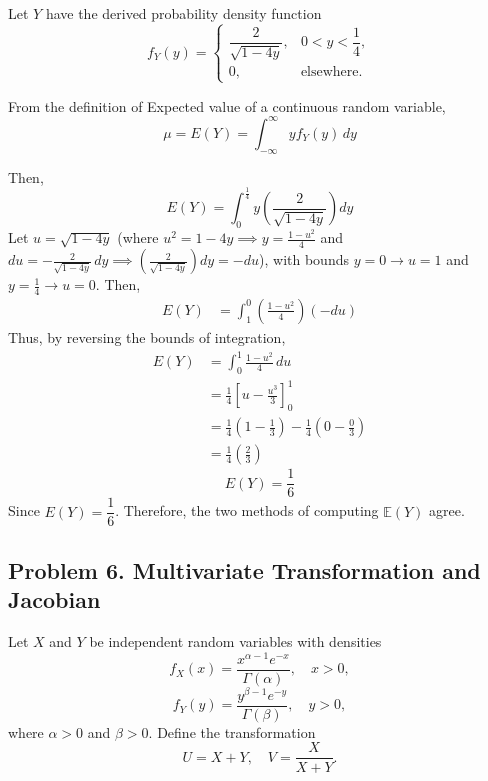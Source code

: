 \documentclass[letterpaper,12pt]{article}
\begin{document}
\begin{enumerate}[(a)]
\begin{list}{}{}
        \vspace{1em}
        Let $Y$ have the derived probability density function
        \[        f_Y(y) = \begin{cases} \dfrac{2}{\sqrt{1 - 4y}}, & 0 < y < \dfrac{1}{4}, \\ 0, & \text{elsewhere.} \end{cases}
        \]

        \vspace{0.5em}
        From the definition of Expected value of a continuous random variable, 
        \[        \mu = E(Y) = \int_{-\infty}^{\infty} y f_Y(y) \, dy
        \]

        \noindent Then,
        \[        E(Y) = \int_{0}^{\frac{1}{4}} y \left( \frac{2}{\sqrt{1 - 4y}} \right) dy
        \]
       Let $u = \sqrt{1 - 4y}$ (where $u^2 = 1 - 4y \implies y = \frac{1 - u^2}{4}$ and $du = -\frac{2}{\sqrt{1 - 4y}} \, dy \implies \left(\frac{2}{\sqrt{1 - 4y}}\right) dy = -du$), with bounds $y = 0 \to u = 1$ and $y = \frac{1}{4} \to u = 0$. Then,
        \begin{align*}
        E(Y) &= \int_{1}^{0} \left( \frac{1 - u^2}{4} \right) (-du)
        \end{align*}
        Thus, by reversing the bounds of integration,
        \begin{align*}
        E(Y) &= \int_{0}^{1} \frac{1 - u^2}{4} \, du \\
        &= \frac{1}{4} \left[ u - \frac{u^3}{3} \right]_0^1 \\
        &= \frac{1}{4} \left( 1 - \frac{1}{3} \right) - \frac{1}{4} \left( 0 - \frac{0}{3} \right) \\
        &= \frac{1}{4} \left( \frac{2}{3} \right)
        \end{align*}
                \[  \boxed{E(Y)= \frac{1}{6}}\]
        Since $E(Y) = \dfrac{1}{6}$.  Therefore, the two methods of computing $\mathbb{E}(Y)$ agree.
    \end{list}
\end{enumerate}

\vspace{1.5em}

\subsection*{Problem 6. Multivariate Transformation and Jacobian \hfill \mdseries[16 points]}

Let $X$ and $Y$ be independent random variables with densities
\[f_X(x) = \frac{x^{\alpha-1} e^{-x}}{\Gamma(\alpha)}, \quad x > 0,\]
\[f_Y(y) = \frac{y^{\beta-1} e^{-y}}{\Gamma(\beta)}, \quad y > 0,\]
where $\alpha > 0$ and $\beta > 0$. Define the transformation
\[U = X + Y, \quad V = \frac{X}{X + Y}.\]
\end{document}
